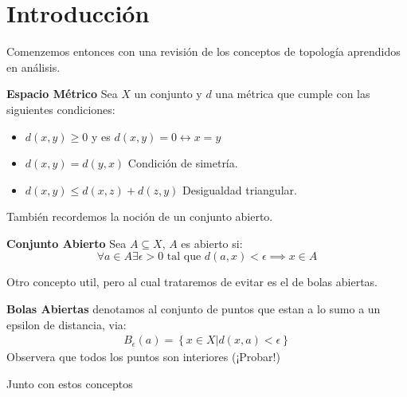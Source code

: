 \section{Introducción}
Comenzemos entonces con una revisión de los conceptos de topología aprendidos en análisis.
\begin{define}
	\textbf{Espacio Métrico} Sea $X$ un conjunto y $d$ una métrica que cumple con las siguientes condiciones:
	\begin{itemize}
		\item $d(x,y) \geq 0 $ \quad y es $d(x,y) = 0 \leftrightarrow  x = y$
		\item $d(x,y) = d(y,x) $ Condición de simetría.
		\item $ d(x,y) \leq d(x,z) + d(z,y) $ Desigualdad triangular.
	\end{itemize}
\end{define}
También recordemos la noción de un conjunto abierto.
\begin{define}
	\textbf{Conjunto Abierto} Sea $A \subseteq X$, $A$ es abierto si:
	\[ 	\forall a \in A \exists \epsilon > 0 \text{ tal que } d(a,x) < \epsilon \implies x \in A \]
\end{define}
Otro concepto util, pero al cual trataremos de evitar es el de bolas abiertas.
\begin{define}
	\textbf{Bolas Abiertas} denotamos al conjunto de puntos que estan a lo sumo a un epsilon de distancia, via:
	\begin{align*}
	B_{\epsilon}(a) = \left\lbrace x \in  X | d(x,a) < \epsilon \right\rbrace
	\end{align*} %
	Observera que todos los puntos son interiores (¡Probar!)
\end{define}
Junto con estos conceptos
